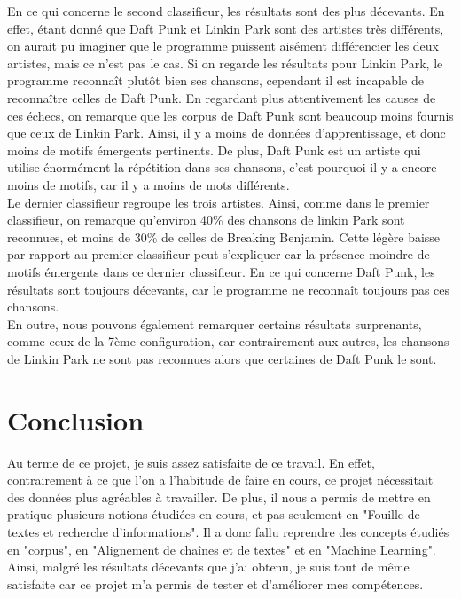 \documentclass[a4paper]{article}
\begin{document}
	En ce qui concerne le second classifieur, les résultats sont des plus décevants. En effet, étant donné que Daft Punk et Linkin Park sont des artistes très différents, on aurait pu imaginer que le programme puissent aisément différencier les deux artistes, mais ce n'est pas le cas. Si on regarde les résultats pour Linkin Park, le programme reconnaît plutôt bien ses chansons, cependant il est incapable de reconnaître celles de Daft Punk. En regardant plus attentivement les causes de ces échecs, on remarque que les corpus de Daft Punk sont beaucoup moins fournis que ceux de Linkin Park. Ainsi, il y a moins de données d'apprentissage, et donc moins de motifs émergents pertinents. De plus, Daft Punk est un artiste qui utilise énormément la répétition dans ses chansons, c'est pourquoi il y a encore moins de motifs, car il y a moins de mots différents. \\
	
	Le dernier classifieur regroupe les trois artistes. Ainsi, comme dans le premier classifieur, on remarque qu'environ 40\% des chansons de linkin Park sont reconnues, et moins de 30\% de celles de Breaking Benjamin. Cette légère baisse par rapport au premier classifieur peut s'expliquer car la présence moindre de motifs émergents dans ce dernier classifieur. En ce qui concerne Daft Punk, les résultats sont toujours décevants, car le programme ne reconnaît toujours pas ces chansons.\\
	
	En outre, nous pouvons également remarquer certains résultats surprenants, comme ceux de la 7ème configuration, car contrairement aux autres, les chansons de Linkin Park ne sont pas reconnues alors que certaines de Daft Punk le sont.
	
	\section{Conclusion}
	
	Au terme de ce projet, je suis assez satisfaite de ce travail. En effet, contrairement à ce que l'on a l'habitude de faire en cours, ce projet nécessitait des données plus agréables à travailler. De plus, il nous a permis de mettre en pratique plusieurs notions étudiées en cours, et pas seulement en "Fouille de textes et recherche d'informations". Il a donc fallu reprendre des concepts étudiés en "corpus", en "Alignement de chaînes et de textes" et en "Machine Learning". Ainsi, malgré les résultats décevants que j'ai obtenu, je suis tout de même satisfaite car ce projet m'a permis de tester et d'améliorer mes compétences.

	
\end{document}
